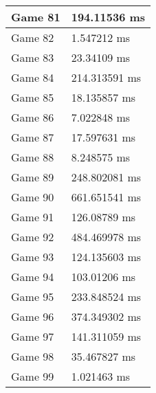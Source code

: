\begin{tabular}{|l|l|}
	Game 81 & 194.11536 ms \\ \hline
	Game 82 & 1.547212 ms \\ \hline
	Game 83 & 23.34109 ms \\ \hline
	Game 84 & 214.313591 ms \\ \hline
	Game 85 & 18.135857 ms \\ \hline
	Game 86 & 7.022848 ms \\ \hline
	Game 87 & 17.597631 ms \\ \hline
	Game 88 & 8.248575 ms \\ \hline
	Game 89 & 248.802081 ms \\ \hline
	Game 90 & 661.651541 ms \\ \hline
	Game 91 & 126.08789 ms \\ \hline
	Game 92 & 484.469978 ms \\ \hline
	Game 93 & 124.135603 ms \\ \hline
	Game 94 & 103.01206 ms \\ \hline
	Game 95 & 233.848524 ms \\ \hline
	Game 96 & 374.349302 ms \\ \hline
	Game 97 & 141.311059 ms \\ \hline
	Game 98 & 35.467827 ms \\ \hline
	Game 99 & 1.021463 ms \\ \hline
\end{tabular}
